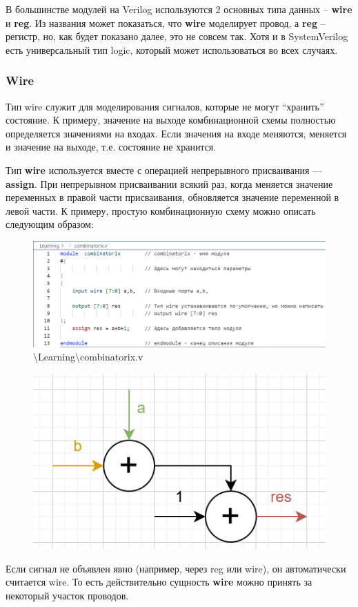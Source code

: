 \documentclass[a4paper,12pt]{article} %
\begin{document}
В большинстве модулей на Verilog используются 2 основных типа данных – \textbf{wire} и \textbf{reg}. Из названия может показаться, что \textbf{wire} моделирует провод, а \textbf{reg} – регистр, но, как будет показано далее, это не совсем так. Хотя и в SystemVerilog есть универсальный тип logic, который может использоваться во всех случаях.

\subsubsection{Wire}

Тип wire служит для моделирования сигналов, которые не могут “хранить” состояние. К примеру, значение на выходе комбинационной схемы полностью определяется значениями на входах. Если значения на входе меняются, меняется и значение на выходе, т.е. состояние не хранится.

Тип \textbf{wire} используется вместе с операцией непрерывного присваивания — \textbf{assign}. При непрерывном присваивании всякий раз, когда меняется значение переменных в правой части присваивания, обновляется значение переменной в левой части. К примеру, простую комбинационную схему можно описать следующим образом:
\begin{figure}[H]
    \centering
    \includegraphics[width=1\linewidth]{Learning/combinatorix.png}
    \caption{\textbackslash Learning\textbackslash combinatorix.v}
\end{figure}
\begin{figure}[H]
    \centering
    \includegraphics[width=0.75\linewidth]{Learning/combinatorix1.png}
\end{figure}
Если сигнал не объявлен явно (например, через reg или wire), он автоматически считается wire.
То есть действительно сущность \textbf{wire} можно принять за некоторый участок проводов. 
\end{document}
